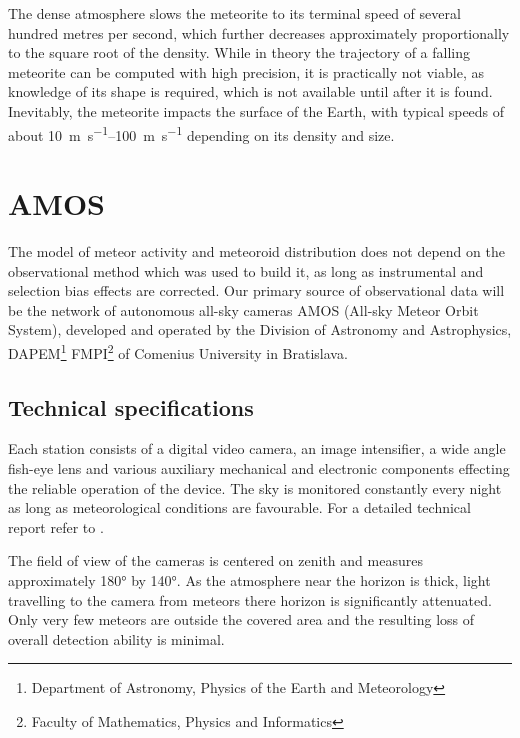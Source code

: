        The dense atmosphere slows the meteorite to its terminal speed of several hundred metres per second,
        which further decreases approximately proportionally to the square root of the density.
        While in theory the trajectory of a falling meteorite can be computed with high precision,
        it is practically not viable, as knowledge of its shape is required, which is not available
        until after it is found.
        Inevitably, the meteorite impacts the surface of the Earth,
        with typical speeds of about \SIrange{10}{100}{\metre\per\second} depending on its density and size.

\section{AMOS} \label{iA}
    The model of meteor activity and meteoroid distribution does not depend on the observational method
    which was used to build it, as long as instrumental and selection bias effects are corrected.
    Our primary source of observational data will be the network of autonomous all-sky cameras AMOS (All-sky Meteor Orbit System),
    developed and operated by the Division of Astronomy and Astrophysics,
    DAPEM\footnote{Department of Astronomy, Physics of the Earth and Meteorology}
    FMPI\footnote{Faculty of Mathematics, Physics and Informatics} of Comenius University in Bratislava.

    \subsection{Technical specifications} \label{iAt}
        Each station consists of a digital video camera, an image intensifier, a wide angle fish-eye lens
        and various auxiliary mechanical and electronic components effecting
        the reliable operation of the device. The sky is monitored constantly every night
        as long as meteorological conditions are favourable. For a detailed technical report refer to \citet{zigo+2013,toth+2015}.

        The field of view of the cameras is centered on zenith and measures approximately \ang{180} by \ang{140}.
        As the atmosphere near the horizon is thick, light travelling to the camera from meteors there horizon is significantly attenuated.
        Only very few meteors are outside the covered area and the resulting loss of overall detection ability is minimal.

